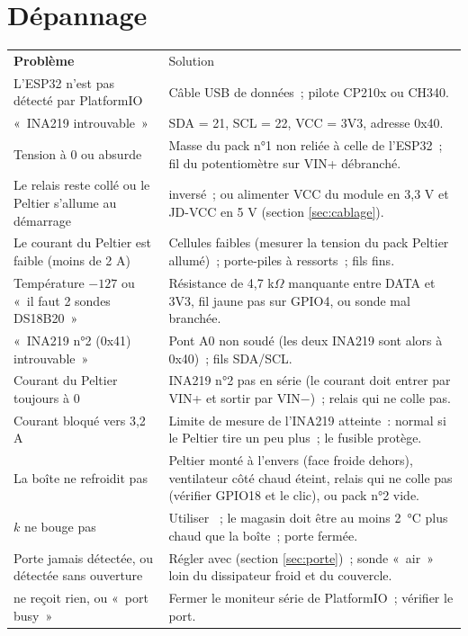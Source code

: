 \section{Dépannage}
\begin{tabularx}{\linewidth}{P{5cm}L}
 \textbf{Problème} & Solution \\
L'ESP32 n'est pas détecté par PlatformIO & Câble USB de données~; pilote CP210x ou CH340. \\
«~INA219 introuvable~» & SDA = 21, SCL = 22, VCC = 3V3, adresse 0x40. \\
Tension à 0 ou absurde & Masse du pack n°1 non reliée à celle de l'ESP32~; fil du potentiomètre sur VIN+ débranché. \\
Le relais reste collé ou le Peltier s'allume au démarrage &  inversé~; ou alimenter VCC du module en 3,3 V et JD-VCC en 5 V (section \ref{sec:cablage}). \\
Le courant du Peltier est faible (moins de 2 A) & Cellules faibles (mesurer la tension du pack Peltier allumé)~; porte-piles à ressorts~; fils fins. \\
Température $-127$ ou «~il faut 2 sondes DS18B20~» & Résistance de 4,7 k$\Omega$ manquante entre DATA et 3V3, fil jaune pas sur GPIO4, ou sonde mal branchée. \\
«~INA219 n°2 (0x41) introuvable~» & Pont A0 non soudé (les deux INA219 sont alors à 0x40)~; fils SDA/SCL. \\
Courant du Peltier toujours à 0 & INA219 n°2 pas en série (le courant doit entrer par VIN+ et sortir par VIN$-$)~; relais qui ne colle pas. \\
Courant bloqué vers 3,2 A & Limite de mesure de l'INA219 atteinte~: normal si le Peltier tire un peu plus~; le fusible protège. \\
La boîte ne refroidit pas & Peltier monté à l'envers (face froide dehors), ventilateur côté chaud éteint, relais qui ne colle pas (vérifier GPIO18 et le clic), ou pack n°2 vide. \\
$k$ ne bouge pas & Utiliser ~; le magasin doit être au moins 2~°C plus chaud que la boîte~; porte fermée. \\
Porte jamais détectée, ou détectée sans ouverture & Régler  avec  (section \ref{sec:porte})~; sonde «~air~» loin du dissipateur froid et du couvercle. \\
 ne reçoit rien, ou «~port busy~» & Fermer le moniteur série de PlatformIO~; vérifier le port. \\

\end{tabularx}
